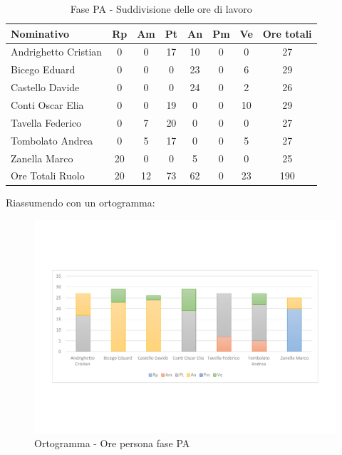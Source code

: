 \documentclass[../PianoProgetto.tex]{subfiles}
\begin{document}
	\begin{table}[h]
		\centering
	
		\begin{tabularx}{\textwidth}{l  * {6}{C}  c}
			\toprule
			\textbf{Nominativo} & \textbf{Rp} & \textbf{Am} & \textbf{Pt} 
						& \textbf{An} & \textbf{Pm} & \textbf{Ve} & \textbf{Ore totali} \\
			\midrule
			Andrighetto Cristian & 0 & 0 &	17 & 10 & 0 & 0 & 27 \\
			Bicego Eduard & 0 & 0 & 0 & 23 & 0 & 6 & 29 \\
			Castello Davide & 0 & 0 & 0 & 24 & 0 & 2 & 26 \\
			Conti Oscar Elia & 0 & 0 &	19 & 0 & 0 & 10 & 29 \\
			Tavella Federico &	0 & 7 & 20 & 0 & 0 & 0 & 27 \\
			Tombolato Andrea & 0 & 5 &	17 & 0 & 0 & 5 & 27 \\
			Zanella Marco & 20 & 0 & 0 & 5 & 0 & 0 & 25 \\
			\midrule			
			Ore Totali Ruolo & 20 & 12 & 73 & 62 & 0 & 23 & 190 \\
			\bottomrule
			
		\end{tabularx}
		\caption{Fase PA - Suddivisione delle ore di lavoro}
		\label{tab:fasePA_ore}
	\end{table}
\vfill	
	Riassumendo con un ortogramma:	
	
	\begin{figure}[!h]
		\centering
		\includegraphics[width=\textwidth , trim=2cm 5cm 2cm 5cm]{grafici/PA/PA-ore-persona}
			\caption{Ortogramma - Ore persona fase PA}
		\label{fig:BarChart-fasePA_ore}
	\end{figure}
\vfill	
\newpage
	
\end{document}
